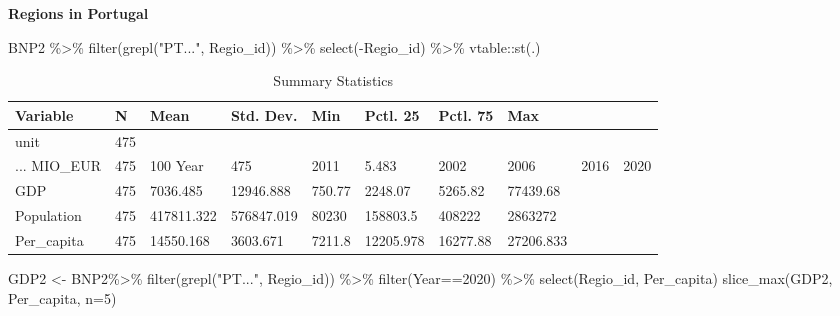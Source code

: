 \documentclass[
]{article}
\newenvironment{Shaded}{\begin{snugshade}}{\end{snugshade}}
\newcommand{\AttributeTok}[1]{\textcolor[rgb]{0.77,0.63,0.00}{#1}}
\newcommand{\DecValTok}[1]{\textcolor[rgb]{0.00,0.00,0.81}{#1}}
\newcommand{\FunctionTok}[1]{\textcolor[rgb]{0.00,0.00,0.00}{#1}}
\newcommand{\NormalTok}[1]{#1}
\newcommand{\OtherTok}[1]{\textcolor[rgb]{0.56,0.35,0.01}{#1}}
\newcommand{\SpecialCharTok}[1]{\textcolor[rgb]{0.00,0.00,0.00}{#1}}
\newcommand{\StringTok}[1]{\textcolor[rgb]{0.31,0.60,0.02}{#1}}
\begin{document}
\textbf{Regions in Portugal}

\begin{Shaded}
\begin{Highlighting}[]
\NormalTok{BNP2 }\SpecialCharTok{\%\textgreater{}\%}
  \FunctionTok{filter}\NormalTok{(}\FunctionTok{grepl}\NormalTok{(}\StringTok{"PT..."}\NormalTok{, Regio\_id)) }\SpecialCharTok{\%\textgreater{}\%}
  \FunctionTok{select}\NormalTok{(}\SpecialCharTok{{-}}\NormalTok{Regio\_id) }\SpecialCharTok{\%\textgreater{}\%}
\NormalTok{  vtable}\SpecialCharTok{::}\FunctionTok{st}\NormalTok{(.)}
\end{Highlighting}
\end{Shaded}

\begin{table}

\caption{\label{tab:unnamed-chunk-10}Summary Statistics}
\centering
\begin{tabular}[t]{llllllll}
\toprule
Variable & N & Mean & Std. Dev. & Min & Pctl. 25 & Pctl. 75 & Max\\
\midrule
unit & 475 &  &  &  &  &  & \\
... MIO_EUR & 475 & 100%
Year & 475 & 2011 & 5.483 & 2002 & 2006 & 2016 & 2020\\
GDP & 475 & 7036.485 & 12946.888 & 750.77 & 2248.07 & 5265.82 & 77439.68\\
Population & 475 & 417811.322 & 576847.019 & 80230 & 158803.5 & 408222 & 2863272\\
\addlinespace
Per_capita & 475 & 14550.168 & 3603.671 & 7211.8 & 12205.978 & 16277.88 & 27206.833\\
\bottomrule
\end{tabular}
\end{table}

\begin{Shaded}
\begin{Highlighting}[]
\NormalTok{GDP2 }\OtherTok{\textless{}{-}}\NormalTok{ BNP2}\SpecialCharTok{\%\textgreater{}\%}
  \FunctionTok{filter}\NormalTok{(}\FunctionTok{grepl}\NormalTok{(}\StringTok{"PT..."}\NormalTok{, Regio\_id)) }\SpecialCharTok{\%\textgreater{}\%}
  \FunctionTok{filter}\NormalTok{(Year}\SpecialCharTok{==}\DecValTok{2020}\NormalTok{) }\SpecialCharTok{\%\textgreater{}\%}
  \FunctionTok{select}\NormalTok{(Regio\_id, Per\_capita)}
\FunctionTok{slice\_max}\NormalTok{(GDP2, Per\_capita, }\AttributeTok{n=}\DecValTok{5}\NormalTok{)}
\end{Highlighting}
\end{Shaded}
\end{document}
